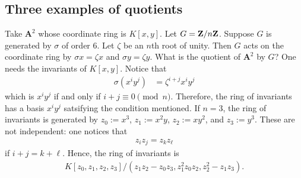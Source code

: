 \documentclass [11 pt, oneside, margin = 1 in] {article}
\begin{document}
\subsection{Three examples of quotients}
\begin{example}\label{}\text{}
Take $\mathbf{A}^2$ whose coordinate ring is $K[x,y]$. Let $G=\mathbf Z / n\mathbf Z$. Suppose $G$ is generated by $\sigma$ of order $6$. Let $\zeta$ be an $n$th root of unity. Then $G$ acts on the coordinate ring by $\sigma x = \zeta x$ and $\sigma y = \zeta y$. What is the quotient of $\mathbf{A}^2$ by $G$? One needs the invariants of $K[x,y]$. Notice that 
\begin{align*}
	\sigma(x^iy^j) &= \zeta^{i+j} x^iy^j
\end{align*}
which is $x^iy^j$ if and only if $i+j\equiv 0\pmod n$. Therefore, the ring of invariants has a basis $x^iy^j$ satsifying the condition mentioned. If $n=3$, the ring of invariants is generated by $z_0:=x^3$, $z_1:=x^2y$, $z_2:=xy^2$, and $z_3:=y^3$. These are not independent: one notices that
\begin{align*}
	z_iz_j = z_kz_\ell
\end{align*}
if $i+j=k+\ell$. Hence, the ring of invariants is
\begin{align*}
	K[z_0,z_1,z_2,z_3] / (z_1z_2-z_0z_3, z_1^2 z_0z_2, z_2^2-z_1z_3). 
\end{align*}
\end{example}
\end{document}
